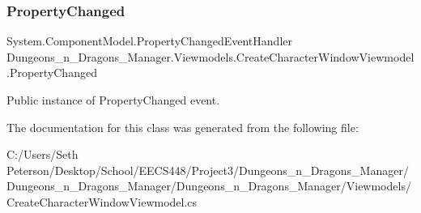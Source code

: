 \subsubsection{\texorpdfstring{Property\+Changed}{PropertyChanged}}
{\footnotesize\ttfamily System.\+Component\+Model.\+Property\+Changed\+Event\+Handler Dungeons\+\_\+n\+\_\+\+Dragons\+\_\+\+Manager.\+Viewmodels.\+Create\+Character\+Window\+Viewmodel.\+Property\+Changed}



Public instance of Property\+Changed event. 



The documentation for this class was generated from the following file\+:\begin{DoxyCompactItemize}
\item 
C\+:/\+Users/\+Seth Peterson/\+Desktop/\+School/\+E\+E\+C\+S448/\+Project3/\+Dungeons\+\_\+n\+\_\+\+Dragons\+\_\+\+Manager/\+Dungeons\+\_\+n\+\_\+\+Dragons\+\_\+\+Manager/\+Dungeons\+\_\+n\+\_\+\+Dragons\+\_\+\+Manager/\+Viewmodels/Create\+Character\+Window\+Viewmodel.\+cs\end{DoxyCompactItemize}
